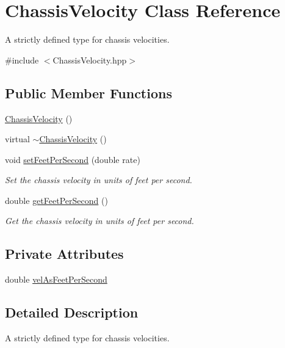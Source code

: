 \hypertarget{classChassisVelocity}{\section{Chassis\-Velocity Class Reference}
\label{classChassisVelocity}
}


A strictly defined type for chassis velocities.  




{\ttfamily \#include $<$Chassis\-Velocity.\-hpp$>$}

\subsection*{Public Member Functions}
\begin{DoxyCompactItemize}
\item 
\hyperlink{classChassisVelocity_a624493dce2867598608af76a204e86b2}{Chassis\-Velocity} ()
\item 
virtual \hyperlink{classChassisVelocity_a46f142c815b8df9e4e63e282593c00c3}{$\sim$\-Chassis\-Velocity} ()
\item 
void \hyperlink{classChassisVelocity_a03a34476131a923a661115b8967e6e4d}{set\-Feet\-Per\-Second} (double rate)
\begin{DoxyCompactList}\small\item\em Set the chassis velocity in units of feet per second. \end{DoxyCompactList}\item 
double \hyperlink{classChassisVelocity_a4a1b2d7ee129dacd1dba3bb80d350169}{get\-Feet\-Per\-Second} ()
\begin{DoxyCompactList}\small\item\em Get the chassis velocity in units of feet per second. \end{DoxyCompactList}\end{DoxyCompactItemize}
\subsection*{Private Attributes}
\begin{DoxyCompactItemize}
\item 
double \hyperlink{classChassisVelocity_a7dd4831715e0602a649fda9d28fd80af}{vel\-As\-Feet\-Per\-Second}
\end{DoxyCompactItemize}


\subsection{Detailed Description}
A strictly defined type for chassis velocities. 

